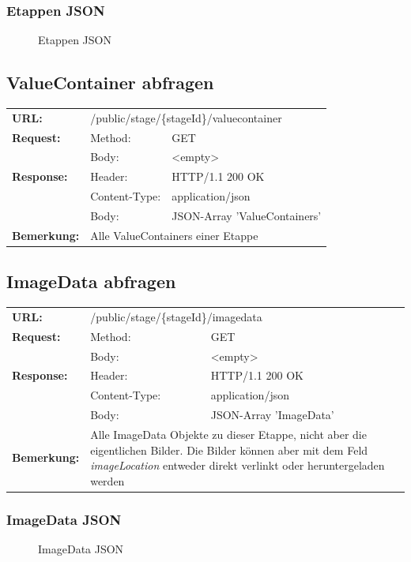 \subsubsection{Etappen JSON}
\begin{figure}[H]
	\centering
	
	\caption{Etappen JSON}
\end{figure}

\subsection{ValueContainer abfragen}
\begin{longtable}{ p{2.5cm} p{3.5cm} p{6cm}}
	\textbf{URL:} & \multicolumn{2}{l}{/public/stage/\{stageId\}/valuecontainer} \\
	\textbf{Request:} & Method: & GET \\
		& Body: & <empty>\\
	\textbf{Response:} &  Header: & HTTP/1.1 200 OK \\
		& Content-Type: & application/json \\
		& Body: & JSON-Array 'ValueContainers'\\
	\textbf{Bemerkung:} & \multicolumn{2}{p{10cm}}{Alle ValueContainers einer Etappe}
\end{longtable}

\subsection{ImageData abfragen}
\begin{longtable}{ p{2.5cm} p{3.5cm} p{6cm}}
	\textbf{URL:} & \multicolumn{2}{l}{/public/stage/\{stageId\}/imagedata} \\
	\textbf{Request:} & Method: & GET \\
		& Body: & <empty>\\
	\textbf{Response:} &  Header: & HTTP/1.1 200 OK \\
		& Content-Type: & application/json \\
		& Body: & JSON-Array 'ImageData'\\
	\textbf{Bemerkung:} & \multicolumn{2}{p{10cm}}{Alle ImageData Objekte zu dieser Etappe, nicht aber die eigentlichen Bilder. Die Bilder können aber mit dem Feld \textit{imageLocation} entweder direkt verlinkt oder heruntergeladen werden}
\end{longtable}

\subsubsection{ImageData JSON}
\begin{figure}[H]
	\centering
	
	\caption{ImageData JSON}
\end{figure}

